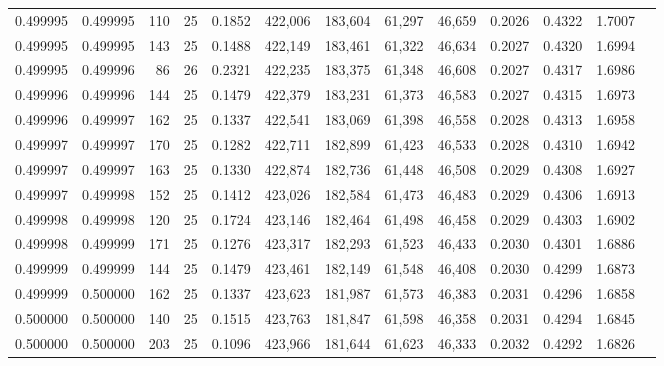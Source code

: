 \begin{tabular}{rrrrrrrrrrrrr}
0.499995 & 0.499995 & 110 &  25 &                                     0.1852 & 422,006 & 183,604 &  61,297 &  46,659 & 0.2026 & 0.4322 & 1.7007 \\
0.499995 & 0.499995 & 143 &  25 &                                     0.1488 & 422,149 & 183,461 &  61,322 &  46,634 & 0.2027 & 0.4320 & 1.6994 \\
0.499995 & 0.499996 &  86 &  26 &                                     0.2321 & 422,235 & 183,375 &  61,348 &  46,608 & 0.2027 & 0.4317 & 1.6986 \\
0.499996 & 0.499996 & 144 &  25 &                                     0.1479 & 422,379 & 183,231 &  61,373 &  46,583 & 0.2027 & 0.4315 & 1.6973 \\
0.499996 & 0.499997 & 162 &  25 &                                     0.1337 & 422,541 & 183,069 &  61,398 &  46,558 & 0.2028 & 0.4313 & 1.6958 \\
0.499997 & 0.499997 & 170 &  25 &                                     0.1282 & 422,711 & 182,899 &  61,423 &  46,533 & 0.2028 & 0.4310 & 1.6942 \\
0.499997 & 0.499997 & 163 &  25 &                                     0.1330 & 422,874 & 182,736 &  61,448 &  46,508 & 0.2029 & 0.4308 & 1.6927 \\
0.499997 & 0.499998 & 152 &  25 &                                     0.1412 & 423,026 & 182,584 &  61,473 &  46,483 & 0.2029 & 0.4306 & 1.6913 \\
0.499998 & 0.499998 & 120 &  25 &                                     0.1724 & 423,146 & 182,464 &  61,498 &  46,458 & 0.2029 & 0.4303 & 1.6902 \\
0.499998 & 0.499999 & 171 &  25 &                                     0.1276 & 423,317 & 182,293 &  61,523 &  46,433 & 0.2030 & 0.4301 & 1.6886 \\
0.499999 & 0.499999 & 144 &  25 &                                     0.1479 & 423,461 & 182,149 &  61,548 &  46,408 & 0.2030 & 0.4299 & 1.6873 \\
0.499999 & 0.500000 & 162 &  25 &                                     0.1337 & 423,623 & 181,987 &  61,573 &  46,383 & 0.2031 & 0.4296 & 1.6858 \\
0.500000 & 0.500000 & 140 &  25 &                                     0.1515 & 423,763 & 181,847 &  61,598 &  46,358 & 0.2031 & 0.4294 & 1.6845 \\
0.500000 & 0.500000 & 203 &  25 &                                     0.1096 & 423,966 & 181,644 &  61,623 &  46,333 & 0.2032 & 0.4292 & 1.6826 \\

\end{tabular}
